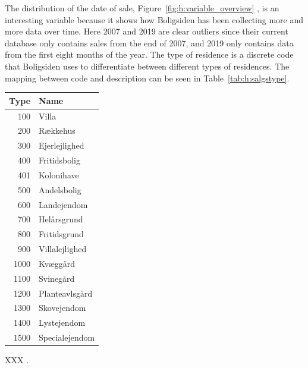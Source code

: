 The distribution of the date of sale, Figure~\ref{fig:h:variable_overview} , is an interesting variable because it shows how Boligsiden has been collecting more and more data over time. Here 2007 and 2019 are clear outliers since their current database only contains sales from the end of 2007, and 2019 only contains data from the first eight months of the year. The type of residence is a discrete code that Boligsiden uses to differentiate between different types of residences. The mapping between code and description can be seen in Table~\ref{tab:h:salgstype}. 

\begin{margintable}
  \centering
  \begin{tabular}{@{}rl@{}}
  Type & Name           \\ 
  \midrule
  100  & Villa          \\ 
  200  & Rækkehus       \\
  300  & Ejerlejlighed  \\
  400  & Fritidsbolig   \\
  401  & Kolonihave     \\
  500  & Andelsbolig    \\
  600  & Landejendom    \\
  700  & Helårsgrund    \\
  800  & Fritidsgrund   \\
  900  & Villalejlighed \\
  1000 & Kvæggård       \\
  1100 & Svinegård      \\
  1200 & Planteavlsgård \\
  1300 & Skovejendom    \\
  1400 & Lystejendom    \\
  1500 & Specialejendom \\ 
  \end{tabular}
  \vspace{\abovecaptionskip}
  \caption{XXX \TODO.}
  \label{tab:h:salgstype}
\end{margintable}

